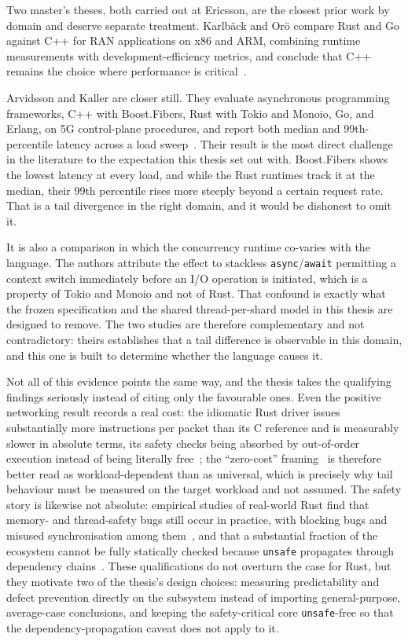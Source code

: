 \documentclass[english,twoside,openright,a4paper,censored,csm,software-track-2020]{HYthesisML}
\begin{document}
Two master's theses, both carried out at Ericsson, are the closest prior work by domain and
deserve separate treatment. Karlb\"ack and Or\"o compare Rust and Go against C++ for RAN
applications on x86 and ARM, combining runtime measurements with development-efficiency metrics,
and conclude that C++ remains the choice where performance is
critical~\cite{karlback2021ran}.

Arvidsson and Kaller are closer still. They evaluate asynchronous programming frameworks, C++ with
Boost.Fibers, Rust with Tokio and Monoio, Go, and Erlang, on 5G control-plane procedures, and
report both median and 99th-percentile latency across a load
sweep~\cite{arvidsson2025async}. Their result is the most direct challenge in the literature to the
expectation this thesis set out with. Boost.Fibers shows the lowest latency at every load, and
while the Rust runtimes track it at the median, their 99th percentile rises more steeply beyond a
certain request rate. That is a tail divergence in the right domain, and it would be dishonest to
omit it.

It is also a comparison in which the concurrency runtime co-varies with the language. The authors
attribute the effect to stackless \texttt{async}/\texttt{await} permitting a context switch
immediately before an I/O operation is initiated, which is a property of Tokio and Monoio and not
of Rust. That confound is exactly what the frozen specification and the shared thread-per-shard
model in this thesis are designed to remove. The two studies are therefore complementary and not
contradictory: theirs establishes that a tail difference is observable in this domain, and this one
is built to determine whether the language causes it.

Not all of this evidence points the same way, and the thesis takes the qualifying findings
seriously instead of citing only the favourable ones. Even the positive networking result
records a real cost: the idiomatic Rust driver issues substantially more instructions per
packet than its C reference and is measurably slower in absolute terms, its safety checks
being absorbed by out-of-order execution instead of being literally
free~\cite{emmerich2019drivers}; the ``zero-cost'' framing~\cite{balasubramanian2017rust} is
therefore better read as workload-dependent than as universal, which is precisely why tail
behaviour must be measured on the target workload and not assumed. The safety story is
likewise not absolute: empirical studies of real-world Rust find that memory- and
thread-safety bugs still occur in practice, with blocking bugs and misused synchronisation
among them~\cite{qin2020rust,qin2024safety}, and that a substantial fraction of the ecosystem
cannot be fully statically checked because \texttt{unsafe} propagates through dependency
chains~\cite{evans2020rust}. These qualifications do not overturn the case for Rust, but they
motivate two of the thesis's design choices: measuring predictability and defect prevention
directly on the subsystem instead of importing general-purpose, average-case conclusions, and
keeping the safety-critical core \texttt{unsafe}-free so that the dependency-propagation
caveat does not apply to it.
\end{document}
